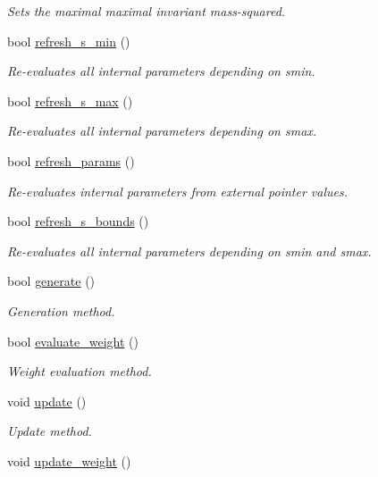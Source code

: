 \begin{DoxyCompactItemize}
\begin{DoxyCompactList}\small\item\em Sets the maximal maximal invariant mass-\/squared. \end{DoxyCompactList}\item 
bool \hyperlink{a00001_a3aea06461838774d655bd82c118c11e2}{refresh\-\_\-s\-\_\-min} ()
\begin{DoxyCompactList}\small\item\em Re-\/evaluates all internal parameters depending on smin. \end{DoxyCompactList}\item 
bool \hyperlink{a00001_a8bdc493b1ed0e29f9fc7ea0aa7e6e510}{refresh\-\_\-s\-\_\-max} ()
\begin{DoxyCompactList}\small\item\em Re-\/evaluates all internal parameters depending on smax. \end{DoxyCompactList}\item 
bool \hyperlink{a00001_af5f174e832ad6c23ecc49d4bc7018727}{refresh\-\_\-params} ()
\begin{DoxyCompactList}\small\item\em Re-\/evaluates internal parameters from external pointer values. \end{DoxyCompactList}\item 
bool \hyperlink{a00001_acccaf0f50a38cb1121bc4159e8a23ced}{refresh\-\_\-s\-\_\-bounds} ()
\begin{DoxyCompactList}\small\item\em Re-\/evaluates all internal parameters depending on smin and smax. \end{DoxyCompactList}\item 
\hypertarget{a00001_a67261f6037fcf42078efb5922eed328b}{bool \hyperlink{a00001_a67261f6037fcf42078efb5922eed328b}{generate} ()}\label{a00001_a67261f6037fcf42078efb5922eed328b}

\begin{DoxyCompactList}\small\item\em Generation method. \end{DoxyCompactList}\item 
\hypertarget{a00001_aa297a5927d2601b0aa2b2553c609e7ec}{bool \hyperlink{a00001_aa297a5927d2601b0aa2b2553c609e7ec}{evaluate\-\_\-weight} ()}\label{a00001_aa297a5927d2601b0aa2b2553c609e7ec}

\begin{DoxyCompactList}\small\item\em Weight evaluation method. \end{DoxyCompactList}\item 
void \hyperlink{a00001_aaf21d07ea43dcc7556ba3fc1c6703160}{update} ()
\begin{DoxyCompactList}\small\item\em Update method. \end{DoxyCompactList}\item 
\hypertarget{a00001_af2ce45f4b873b79942d479ed49787103}{void \hyperlink{a00001_af2ce45f4b873b79942d479ed49787103}{update\-\_\-weight} ()}\label{a00001_af2ce45f4b873b79942d479ed49787103}


\end{DoxyCompactItemize}
